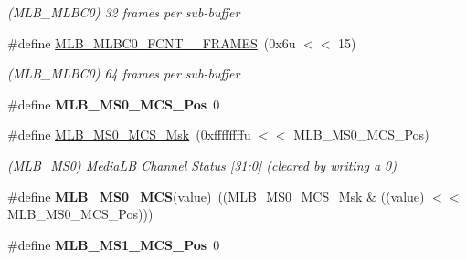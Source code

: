 \begin{DoxyCompactItemize}
\begin{DoxyCompactList}\small\item\em (M\+L\+B\+\_\+\+M\+L\+B\+C0) 32 frames per sub-\/buffer \end{DoxyCompactList}\item 
\mbox{\label{group__SAMV71__MLB_ga345f59a9dc2c97e31eac1ceb856c0a1c}} 
\#define \mbox{\hyperlink{group__SAMV71__MLB_ga345f59a9dc2c97e31eac1ceb856c0a1c}{M\+L\+B\+\_\+\+M\+L\+B\+C0\+\_\+\+F\+C\+N\+T\+\_\+\_\+\+F\+R\+A\+M\+ES}}~(0x6u $<$$<$ 15)
\begin{DoxyCompactList}\small\item\em (M\+L\+B\+\_\+\+M\+L\+B\+C0) 64 frames per sub-\/buffer \end{DoxyCompactList}\item 
\mbox{\label{group__SAMV71__MLB_gafc1db6ce7b7eed317a240f7fab31b57c}} 
\#define {\bfseries M\+L\+B\+\_\+\+M\+S0\+\_\+\+M\+C\+S\+\_\+\+Pos}~0
\item 
\mbox{\label{group__SAMV71__MLB_ga3c0124d60cef450ce54fe9c970ecb6a6}} 
\#define \mbox{\hyperlink{group__SAMV71__MLB_ga3c0124d60cef450ce54fe9c970ecb6a6}{M\+L\+B\+\_\+\+M\+S0\+\_\+\+M\+C\+S\+\_\+\+Msk}}~(0xffffffffu $<$$<$ M\+L\+B\+\_\+\+M\+S0\+\_\+\+M\+C\+S\+\_\+\+Pos)
\begin{DoxyCompactList}\small\item\em (M\+L\+B\+\_\+\+M\+S0) Media\+LB Channel Status \mbox{[}31\+:0\mbox{]} (cleared by writing a 0) \end{DoxyCompactList}\item 
\mbox{\label{group__SAMV71__MLB_gaf8011318bcfa3250ed98dc9945635014}} 
\#define {\bfseries M\+L\+B\+\_\+\+M\+S0\+\_\+\+M\+CS}(value)~((\mbox{\hyperlink{group__SAMV71__MLB_ga3c0124d60cef450ce54fe9c970ecb6a6}{M\+L\+B\+\_\+\+M\+S0\+\_\+\+M\+C\+S\+\_\+\+Msk}} \& ((value) $<$$<$ M\+L\+B\+\_\+\+M\+S0\+\_\+\+M\+C\+S\+\_\+\+Pos)))
\item 
\mbox{\label{group__SAMV71__MLB_ga8144673c8272be494612e88f5ae62c7b}} 
\#define {\bfseries M\+L\+B\+\_\+\+M\+S1\+\_\+\+M\+C\+S\+\_\+\+Pos}~0
\item 
\mbox{\label{group__SAMV71__MLB_ga5646653c3ebcaa778142d6612b5af39f}} 
$$
\end{DoxyCompactItemize}

